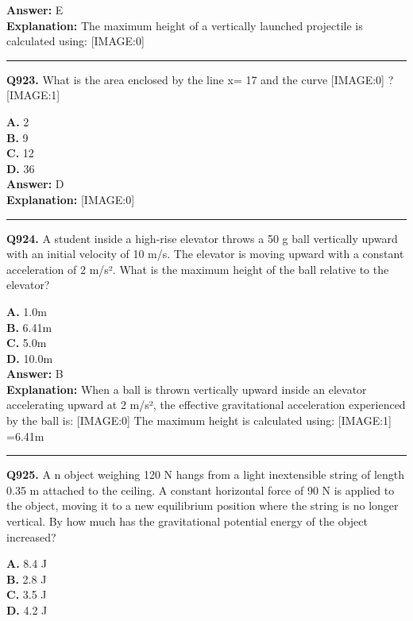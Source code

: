 \documentclass[12pt]{article}
\begin{document}
\textbf{Answer:} E \\
\textbf{Explanation:} The maximum height of a vertically launched projectile is calculated using:
[IMAGE:0]

\hrule
\vspace{1em}


\noindent
\textbf{Q923.} What is the area enclosed by the line x=
17
and the curve
[IMAGE:0]
?
[IMAGE:1]



\textbf{A.} 2 \\
\textbf{B.} 9 \\
\textbf{C.} 12 \\
\textbf{D.} 36 \\

\textbf{Answer:} D \\
\textbf{Explanation:} [IMAGE:0]

\hrule
\vspace{1em}


\noindent
\textbf{Q924.} A student inside a high-rise elevator throws a 50 g ball vertically upward with an initial velocity of 10 m/s. The elevator is moving upward with a constant acceleration of 2 m/s². What is the maximum height of the ball relative to the elevator?



\textbf{A.} 1.0m \\
\textbf{B.} 6.41m \\
\textbf{C.} 5.0m \\
\textbf{D.} 10.0m \\

\textbf{Answer:} B \\
\textbf{Explanation:} When a ball is thrown vertically upward inside an elevator accelerating upward at 2 m/s², the effective gravitational acceleration experienced by the ball is:
[IMAGE:0]
The maximum height is calculated using:
[IMAGE:1]
=6.41m

\hrule
\vspace{1em}


\noindent
\textbf{Q925.} A
n object weighing 120 N hangs from a light inextensible string of length 0.35 m attached to the ceiling. A constant horizontal force of 90 N is applied to the object, moving it to a new equilibrium position where the string is no longer vertical. By how much has the gravitational potential energy of the object increased?



\textbf{A.} 8.4 J \\
\textbf{B.} 2.8 J \\
\textbf{C.} 3.5 J \\
\textbf{D.} 4.2 J \\
\end{document}
